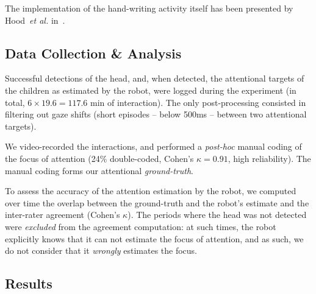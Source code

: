 \documentclass{sig-alternate}
\newcommand{\etal}{\textit{et al.}\xspace}
\begin{document}
The implementation of the hand-writing activity itself has been presented by
Hood~\etal in~\cite{Hood:2015}.

\subsection{Data Collection \& Analysis}

Successful detections of the head, and, when detected, the attentional targets
of the children as estimated by the robot, were logged during the experiment (in
total, $6\times19.6=117.6$ min of interaction). The only post-processing
consisted in filtering out gaze shifts (short episodes -- below 500ms -- between
two attentional targets).

We video-recorded the interactions, and performed a {\it post-hoc} manual coding
of the focus of attention (24\% double-coded, Cohen's $\kappa=0.91$, high
reliability).  The manual coding forms our attentional \emph{ground-truth}.

To assess the accuracy of the attention estimation by the robot, we computed
over time the overlap between the ground-truth and the robot's estimate and the
inter-rater agreement (Cohen's $\kappa$). The periods where the head was not
detected were \emph{excluded} from the agreement computation: at such times, the
robot explicitly knows that it can not estimate the focus of attention, and as
such, we do not consider that it \emph{wrongly} estimates the focus.



\subsection{Results}
\end{document}

